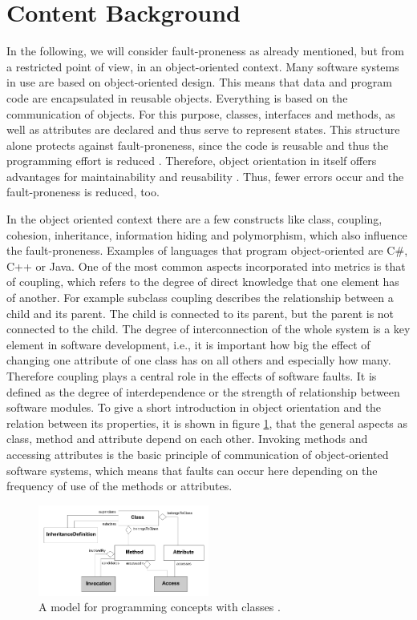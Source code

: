 \section{Content Background}\label{content}

In the following, we will consider fault-proneness as already mentioned, but from a restricted point of view, in an object-oriented context. Many software systems in use are based on object-oriented design. This means that data and program code are encapsulated in reusable objects. Everything is based on the communication of objects. For this purpose, classes, interfaces and methods, as well as attributes are declared and thus serve to represent states. This structure alone protects against fault-proneness, since the code is reusable and thus the programming effort is reduced \cite{fichman1993adoption}. Therefore, object orientation in itself offers advantages for maintainability and reusability \cite{lanza2002beyond}. Thus, fewer errors occur and the fault-proneness is reduced, too. 

In the object oriented context there are a few constructs like class, coupling, cohesion, inheritance, information hiding and polymorphism, which also influence the fault-proneness. Examples of languages that program object-oriented are C\#, C++ or Java.
One of the most common aspects incorporated into metrics is that of coupling, which refers to the degree of direct knowledge that one element has of another. For example subclass coupling describes the relationship between a child and its parent. The child is connected to its parent, but the parent is not connected to the child. The degree of interconnection of the whole system is a key element in software development, i.e., it is important how big the effect of changing one attribute of one class has on all others and especially how many.
Therefore coupling plays a central role in the effects of software faults. It is defined as the degree of interdependence or the strength of relationship between software modules.
To give a short introduction in object orientation and the relation between its properties, it is shown in figure \ref{fig0}, that the general aspects as class, method and attribute depend on each other. Invoking methods and accessing attributes is the basic principle of communication of object-oriented software systems, which means that faults can occur here depending on the frequency of use of the methods or attributes.

\begin{figure}[htbp]
	\centerline{\includegraphics[width=0.5\textwidth]{pictures/oodesign.png}}
	\caption{A model for programming concepts with classes \cite{lanza2002beyond}.}
	\label{fig0}
\end{figure}

